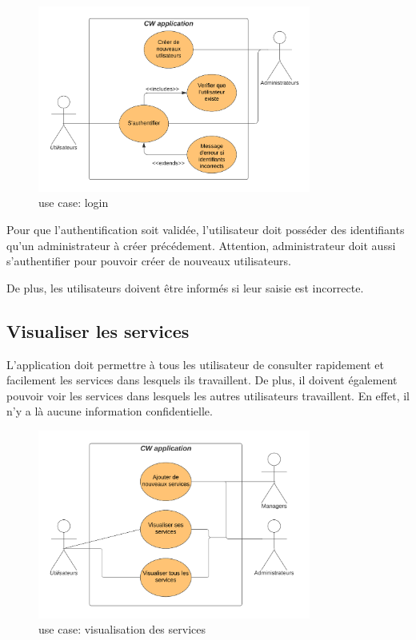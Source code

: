 \begin{figure}[!h]
    \begin{center}
        \includegraphics[width= 0.8\textwidth]{uses cases/logginUC.png}
    \end{center}
    \caption{use case: login}
\end{figure}

Pour que l'authentification soit validée, l'utilisateur doit posséder des identifiants qu'un administrateur à créer précédement. Attention, administrateur doit aussi s'authentifier pour pouvoir créer de nouveaux utilisateurs.

De plus, les utilisateurs doivent être informés si leur saisie est incorrecte.

\subsection*{Visualiser les services}
L'application doit permettre à tous les utilisateur de consulter rapidement et facilement les services dans lesquels ils travaillent. De plus, il doivent également pouvoir voir les services dans lesquels les autres utilisateurs travaillent. En effet, il n'y a là aucune information confidentielle.

\begin{figure}[!h]
    \begin{center}
        \includegraphics[width= 0.8\textwidth]{uses cases/visualiser services.png}
    \end{center}
    \caption{use case: visualisation des services}
\end{figure}